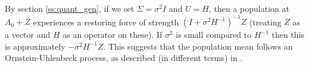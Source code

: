 \documentclass{article}
\newcommand{\R}{\mathbb{R}}
\newcommand{\1}{\mathbbm{1}}
\begin{document}
By section \ref{ss:quant_gen},
if we set $\Sigma=\sigma^2 I$ and $U=H$,
then a population at $A_0+Z$ experiences a restoring force of strength
$(I + \sigma^2 H^{-1})^{-1} Z$ (treating $Z$ as a vector and $H$ as an operator on these).
If $\sigma^2$ is small compared to $H^{-1}$
then this is approximately $-\sigma^2 H^{-1} Z$.
This suggests that the population mean follows an Ornstein-Uhlenbeck process,
as described (in different terms) in \citet{hansen1996translating}.

%
\end{document}
